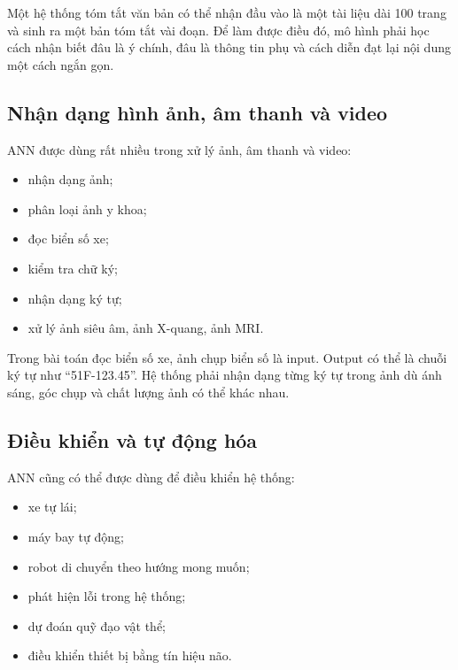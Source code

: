 \begin{vidu}
Một hệ thống tóm tắt văn bản có thể nhận đầu vào là một tài liệu dài 100 trang và sinh ra một bản tóm tắt vài đoạn. Để làm được điều đó, mô hình phải học cách nhận biết đâu là ý chính, đâu là thông tin phụ và cách diễn đạt lại nội dung một cách ngắn gọn.
\end{vidu}

\subsection{Nhận dạng hình ảnh, âm thanh và video}

ANN được dùng rất nhiều trong xử lý ảnh, âm thanh và video:

\begin{itemize}
    \item nhận dạng ảnh;
    \item phân loại ảnh y khoa;
    \item đọc biển số xe;
    \item kiểm tra chữ ký;
    \item nhận dạng ký tự;
    \item xử lý ảnh siêu âm, ảnh X-quang, ảnh MRI.
\end{itemize}

\begin{vidu}
Trong bài toán đọc biển số xe, ảnh chụp biển số là input. Output có thể là chuỗi ký tự như ``51F-123.45''. Hệ thống phải nhận dạng từng ký tự trong ảnh dù ánh sáng, góc chụp và chất lượng ảnh có thể khác nhau.
\end{vidu}

\subsection{Điều khiển và tự động hóa}

ANN cũng có thể được dùng để điều khiển hệ thống:

\begin{itemize}
    \item xe tự lái;
    \item máy bay tự động;
    \item robot di chuyển theo hướng mong muốn;
    \item phát hiện lỗi trong hệ thống;
    \item dự đoán quỹ đạo vật thể;
    \item điều khiển thiết bị bằng tín hiệu não.
\end{itemize}

